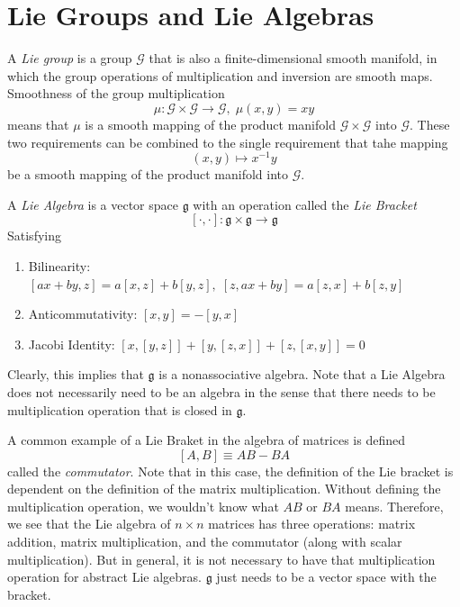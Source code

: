 \documentclass{article}
\begin{document}
\section{Lie Groups and Lie Algebras}

    \begin{definition}
    A \textit{Lie group} is a group $\mathcal{G}$ that is also a finite-dimensional smooth manifold, in which the group operations of multiplication and inversion are smooth maps. Smoothness of the group multiplication
    \[\mu: \mathcal{G} \times \mathcal{G} \longrightarrow \mathcal{G}, \; \mu(x, y) = x y\]
    means that $\mu$ is a smooth mapping of the product manifold $\mathcal{G} \times \mathcal{G}$ into $\mathcal{G}$. These two requirements can be combined to the single requirement that tahe mapping 
    \[(x, y) \mapsto x^{-1} y\]
    be a smooth mapping of the product manifold into $\mathcal{G}$. 
    \end{definition}

    \begin{definition}
    A \textit{Lie Algebra} is a vector space $\mathfrak{g}$ with an operation called the \textit{Lie Bracket} 
    \[[\cdot, \cdot]: \mathfrak{g} \times \mathfrak{g} \longrightarrow \mathfrak{g}\]
    Satisfying
    \begin{enumerate}
        \item Bilinearity: $[ax + by, z] = a[x,z] + b[y,z], \; [z, ax + by] = a[z, x] + b[z,y]$
        \item Anticommutativity: $[x,y] = -[y,x]$
        \item Jacobi Identity: $[x,[y,z]] + [y,[z,x]] + [z,[x,y]] = 0$
    \end{enumerate}
    Clearly, this implies that $\mathfrak{g}$ is a nonassociative algebra. Note that a Lie Algebra does not necessarily need to be an algebra in the sense that there needs to be multiplication operation that is closed in $\mathfrak{g}$. 
    \end{definition}

    \begin{example}
    A common example of a Lie Braket in the algebra of matrices is defined
    \[[A, B] \equiv AB - BA\]
    called the \textit{commutator}. Note that in this case, the definition of the Lie bracket is dependent on the definition of the matrix multiplication. Without defining the multiplication operation, we wouldn't know what $AB$ or $BA$ means. Therefore, we see that the Lie algebra of $n \times n$ matrices has three operations: matrix addition, matrix multiplication, and the commutator (along with scalar multiplication). But in general, it is not necessary to have that multiplication operation for abstract Lie algebras. $\mathfrak{g}$ just needs to be a vector space with the bracket.  
    \end{example}
\end{document}
